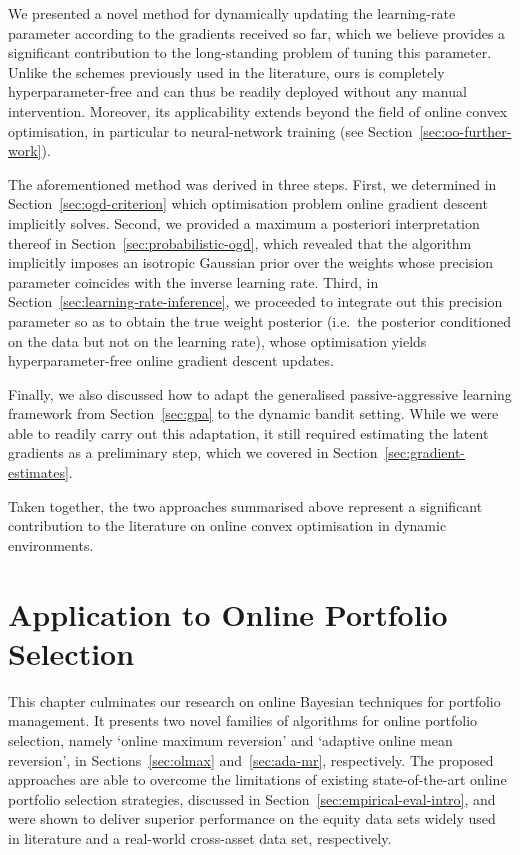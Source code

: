 We presented a novel method for dynamically updating the learning-rate parameter according to the gradients received so far, which we believe provides a significant contribution to the long-standing problem of tuning this parameter. Unlike the schemes previously used in the literature, ours is completely hyperparameter-free and can thus be readily deployed without any manual intervention. Moreover, its applicability extends beyond the field of online convex optimisation, in particular to neural-network training (see Section~\ref{sec:oo-further-work}).

The aforementioned method was derived in three steps. First, we determined in Section~\ref{sec:ogd-criterion} which optimisation problem online gradient descent implicitly solves. Second, we provided a maximum a posteriori interpretation thereof in Section~\ref{sec:probabilistic-ogd}, which revealed that the algorithm implicitly imposes an isotropic Gaussian prior over the weights whose precision parameter coincides with the inverse learning rate. Third, in Section~\ref{sec:learning-rate-inference}, we proceeded to integrate out this precision parameter so as to obtain the true weight posterior (i.e.\ the posterior conditioned on the data but not on the learning rate), whose optimisation yields hyperparameter-free online gradient descent updates.

Finally, we also discussed how to adapt the generalised passive-aggressive learning framework from Section~\ref{sec:gpa} to the dynamic bandit setting. While we were able to readily carry out this adaptation, it still required estimating the latent gradients as a preliminary step, which we covered in Section~\ref{sec:gradient-estimates}.

Taken together, the two approaches summarised above represent a significant contribution to the literature on online convex optimisation in dynamic environments.


\section{Application to Online Portfolio Selection}

This chapter culminates our research on online Bayesian techniques for portfolio management. It presents two novel families of algorithms for online portfolio selection, namely `online maximum reversion' and `adaptive online mean reversion', in Sections~\ref{sec:olmax} and~\ref{sec:ada-mr}, respectively. The proposed approaches are able to overcome the limitations of existing state-of-the-art online portfolio selection strategies, discussed in Section~\ref{sec:empirical-eval-intro}, and were shown to deliver superior performance on the equity data sets widely used in literature and a real-world cross-asset data set, respectively.

